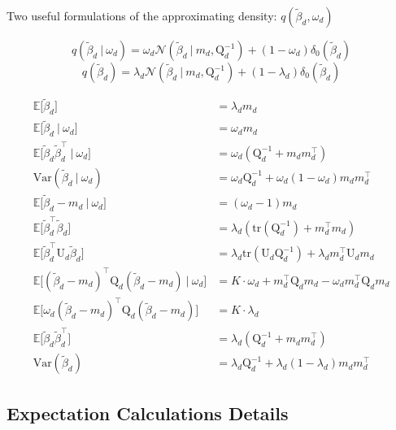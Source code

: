 \documentclass[twoside,11pt]{article}
\newcommand\given[1][]{\:#1\vert\:}
\newcommand{\transpose}[1]{#1^{\intercal}}
\newcommand{\E}{\mathbb{E}}
\newcommand{\betad}{\tilde{\beta}_d}
\newcommand{\umat}{\mathrm{U}}
\newcommand{\qmat}{\mathrm{Q}}
\newcommand{\qbeta}{\mathcal{N} \left( \betad \given m_d, \qmat_d^{-1} \right)}
\newcommand{\trace}[1]{\mathrm{tr} \left( #1 \right)}
\newcommand{\var}[1]{\mathrm{Var}\left(#1\right)}
\begin{document}
Two useful formulations of the approximating density: $q \left( \betad, \omega_d \right)$

\begin{equation} \label{eq:qbeta_omega}
	q(\betad \given \omega_d) = \omega_d \qbeta + (1 - \omega_d) \delta_0(\betad)
\end{equation}
\begin{equation}  \label{eq:qbeta_marginal}
	q(\betad) = \lambda_d \qbeta + (1 - \lambda_d) \delta_0(\betad)
\end{equation}

\begin{align*}
	\E \Big[ \betad \Big] &= \lambda_d m_d \\
	\E \Big[ \betad \given \omega_d \Big] &=  \omega_d m_d \\
	\E \Big[ \betad \transpose{\betad} \given \omega_d \Big] &= \omega_d \left( \qmat_d^{-1} + m_d \transpose{m_d} \right) \\
	\var{\betad \given \omega_d} &= \omega_d \qmat_d^{-1} + \omega_d(1-\omega_d) m_d \transpose{m_d} \\
	\E\Big[ \betad - m_d \given \omega_d \Big] &= (\omega_d - 1) m_d \\
	\E \Big[ \transpose{\betad} \betad \Big] &= \lambda_d \left( \trace{\qmat_d^{-1}} + \transpose{m_d} m_d \right) \\
	\E \Big[ \transpose{\betad} \umat_d \betad \Big] &= \lambda_d \trace{\umat_d \qmat_d^{-1}} + \lambda_d \transpose{m_d} \umat_d m_d \\
	\E \Big[ \transpose{(\betad - m_d)} \qmat_{d}(\betad - m_d) \given \omega_d \Big] &= K \cdot \omega_d + \transpose{m_d}\qmat_d m_d - \omega_d \transpose{m_d}\qmat_d m_d\\
	\E \Big[ \omega_d \transpose{(\betad - m_d)} \qmat_{d}(\betad - m_d) \Big] &= K \cdot \lambda_d \\
	\E \Big[ \betad \transpose{\betad} \Big] &=  \lambda_d \left( \qmat_d^{-1} + m_d \transpose{m_d} \right) \\
	\var{\betad} &= \lambda_d \qmat_d^{-1} + \lambda_d(1 - \lambda_d) m_d \transpose{m_d}
\end{align*}


\subsection{Expectation Calculations Details}
\end{document}
